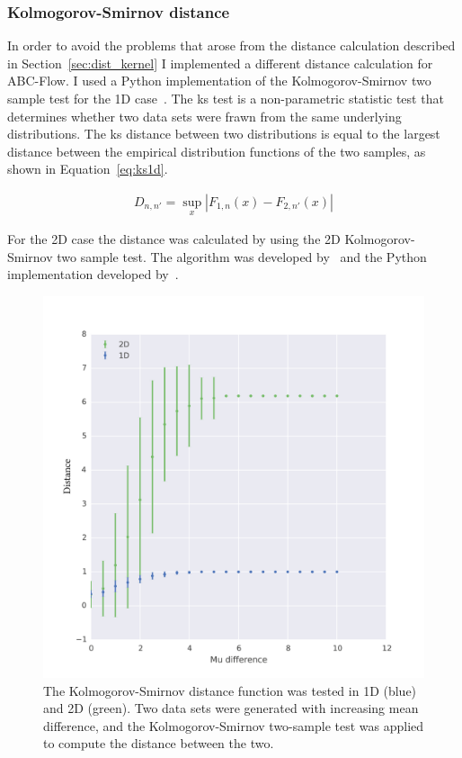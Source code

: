 \subsubsection{Kolmogorov-Smirnov distance}
\label{sec:dist_ks}

In order to avoid the problems that arose from the distance calculation described in Section~\ref{sec:dist_kernel} I implemented a different distance calculation for ABC-Flow. I used a Python implementation of the Kolmogorov-Smirnov two sample test for the 1D case~\autocite{Kolmogorov:1933}. The \acrfull{ks} test is a non-parametric statistic test that determines whether two data sets were frawn from the same underlying distributions. The \acrshort{ks} distance between two distributions is equal to the largest distance between the empirical distribution functions of the two samples, as shown in Equation~\ref{eq:ks1d}.%

\begin{align}
\label{eq:ks1d}
D_{n,n'}=\sup _{x}|F_{1,n}(x)-F_{2,n'}(x)|
\end{align}

For the 2D case the distance was calculated by using the 2D Kolmogorov-Smirnov two sample test. The algorithm was developed by~\textcite{Fasano:1987hg} and the Python implementation developed by~\textcite{Syrtis2016}. 

\begin{figure}[tb]
\begin{center}
	\includegraphics[scale=0.5]{../../chapters/chapterABCFlow/images/epsilon_uniform_musd_KS2sam.png}			
	\caption[Range of distance values using the Kolmogorov-Smirnov distance]{\label{fig:ks-1d2d}The Kolmogorov-Smirnov distance function was tested in 1D (blue) and 2D (green). Two data sets were generated with increasing mean difference, and the Kolmogorov-Smirnov two-sample test was applied to compute the distance between the two.}
	\end{center}
\end{figure}

